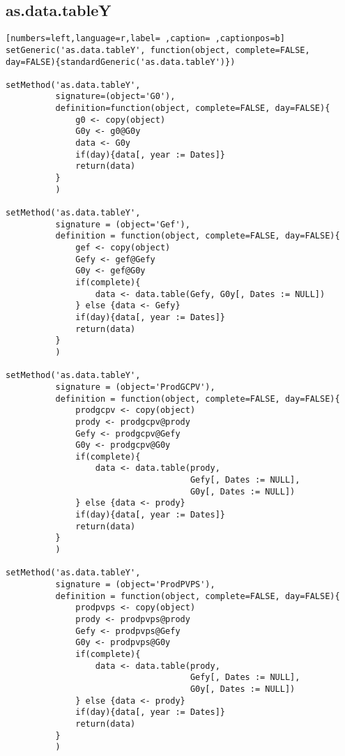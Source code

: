 \subsection{as.data.tableY}
\label{sec:org9c40530}
\begin{lstlisting}[numbers=left,language=r,label= ,caption= ,captionpos=b]
setGeneric('as.data.tableY', function(object, complete=FALSE, day=FALSE){standardGeneric('as.data.tableY')})

setMethod('as.data.tableY',
          signature=(object='G0'),
          definition=function(object, complete=FALSE, day=FALSE){
              g0 <- copy(object)
              G0y <- g0@G0y
              data <- G0y
              if(day){data[, year := Dates]}
              return(data)
          }
          )

setMethod('as.data.tableY',
          signature = (object='Gef'),
          definition = function(object, complete=FALSE, day=FALSE){
              gef <- copy(object)
              Gefy <- gef@Gefy
              G0y <- gef@G0y
              if(complete){
                  data <- data.table(Gefy, G0y[, Dates := NULL])
              } else {data <- Gefy}
              if(day){data[, year := Dates]}
              return(data)
          }
          )

setMethod('as.data.tableY',
          signature = (object='ProdGCPV'),
          definition = function(object, complete=FALSE, day=FALSE){
              prodgcpv <- copy(object)
              prody <- prodgcpv@prody
              Gefy <- prodgcpv@Gefy
              G0y <- prodgcpv@G0y
              if(complete){
                  data <- data.table(prody,
                                     Gefy[, Dates := NULL],
                                     G0y[, Dates := NULL])       
              } else {data <- prody}
              if(day){data[, year := Dates]}
              return(data)
          }
          )

setMethod('as.data.tableY',
          signature = (object='ProdPVPS'),
          definition = function(object, complete=FALSE, day=FALSE){
              prodpvps <- copy(object)
              prody <- prodpvps@prody
              Gefy <- prodpvps@Gefy
              G0y <- prodpvps@G0y
              if(complete){
                  data <- data.table(prody,
                                     Gefy[, Dates := NULL],
                                     G0y[, Dates := NULL])       
              } else {data <- prody}
              if(day){data[, year := Dates]}
              return(data)
          }
          )
\end{lstlisting}
